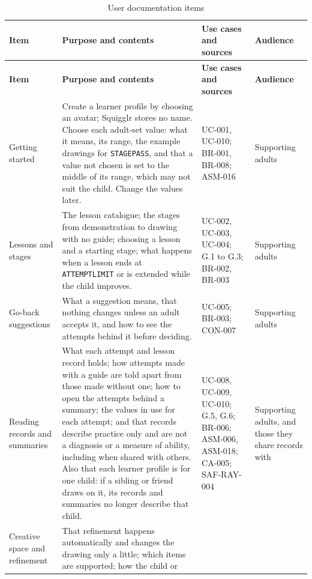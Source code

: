 \documentclass[12pt]{article}
\renewcommand{\_}{\textunderscore\allowbreak}%
\begin{document}
{\small
\begin{longtable}{@{}>{\raggedright\arraybackslash}p{}%
>{\raggedright\arraybackslash}p{}%
>{\raggedright\arraybackslash}p{}%
>{\raggedright\arraybackslash}p{}@{}} \caption{User documentation
items}\label{tab:user-docs}\\
\toprule
\textbf{Item} & \textbf{Purpose and contents} & \textbf{Use cases and sources} &
\textbf{Audience} \\
\midrule
\endfirsthead
\toprule
\textbf{Item} & \textbf{Purpose and contents} & \textbf{Use cases and sources} &
\textbf{Audience} \\
\midrule
\endhead
\bottomrule
\endlastfoot
Getting started & Create a learner profile by choosing an avatar; Squigglr
stores no name. Choose each adult-set value: what it means, its range,
the example drawings for \texttt{STAGE\_PASS}, and that a value not chosen is
set to the middle of its range, which may not suit the child. Change the values
later. & UC-001, UC-010; BR-001, BR-008; ASM-016 & Supporting adults \\
\addlinespace
Lessons and stages & The lesson catalogue; the stages from demonstration to
drawing with no guide; choosing a lesson and a starting stage; what happens when
a lesson ends at \texttt{ATTEMPT\_LIMIT} or is extended while the child
improves. & UC-002, UC-003, UC-004; G.1 to G.3; BR-002, BR-003 & Supporting
adults \\
\addlinespace
Go-back suggestions & What a suggestion means, that nothing changes unless an
adult accepts it, and how to see the attempts behind it before deciding. &
UC-005; BR-003; CON-007 & Supporting adults \\
\addlinespace
Reading records and summaries & What each attempt and lesson record holds; how
attempts made with a guide are told apart from those made without one; how to
open the attempts behind a summary; the values in use for each attempt; and that
records describe practice only and are not a diagnosis or a measure of ability,
including when shared with others. Also that each learner profile is for one child: if a sibling or friend draws on it, its records and summaries no longer describe that child. & UC-008, UC-009, UC-010; G.5, G.6; BR-006;
ASM-006, ASM-018; CA-005; SAF-RAY-004 & Supporting adults, and those they share records
with \\
\addlinespace
Creative space and refinement & That refinement happens automatically and
changes the drawing only a little; which items are supported; how the child or

\end{longtable}}
\end{document}
